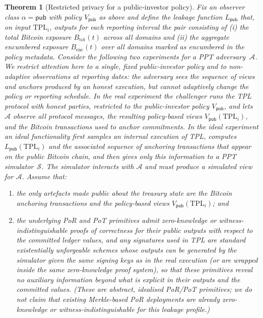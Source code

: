 \documentclass[11pt]{article}
\newtheorem{theorem}{Theorem}
\begin{document}
\begin{theorem}[Restricted privacy for a public-investor policy]
\label{thm:pub-privacy}
Fix an observer class $\alpha = \mathsf{pub}$ with policy $V_{\mathsf{pub}}$ as above and define the leakage function
$L_{\mathsf{pub}}$ that, on input $\mathrm{TPL}_i$, outputs for each reporting interval the pair consisting of
(i) the total Bitcoin exposure $B_{\mathrm{tot}}(t)$ across all domains and (ii) the aggregate encumbered exposure
$B_{\mathrm{enc}}(t)$ over all domains marked as encumbered in the policy metadata.
Consider the following two experiments for a PPT adversary~$\mathcal{A}$. We restrict attention here to a single, fixed public-investor policy and to non-adaptive observations at reporting dates: the adversary sees the sequence of views and anchors produced by an honest execution, but cannot adaptively change the policy or reporting schedule.
In the \emph{real} experiment the challenger runs the TPL protocol with honest parties,
restricted to the public-investor policy $V_{\mathsf{pub}}$, and lets $\mathcal{A}$ observe all
protocol messages, the resulting policy-based views $V_{\mathsf{pub}}(\mathrm{TPL}_i)$, and the Bitcoin
transactions used to anchor commitments.
In the \emph{ideal} experiment an ideal functionality first samples an internal execution of TPL,
computes $L_{\mathsf{pub}}(\mathrm{TPL}_i)$ and the associated sequence of anchoring transactions that appear on the
public Bitcoin chain, and then gives only this information to a PPT simulator~$\mathcal{S}$.
The simulator interacts with $\mathcal{A}$ and must produce a simulated view for $\mathcal{A}$.
Assume that:
\begin{enumerate}[noitemsep]
  \item the only artefacts made public about the treasury state are the Bitcoin anchoring transactions and the
        policy-based views $V_{\mathsf{pub}}(\mathrm{TPL}_i)$; and
  \item the underlying PoR and PoT primitives admit zero-knowledge or witness-indistinguishable proofs of correctness for their public outputs with respect to the committed ledger values, and any signatures used in TPL are standard existentially unforgeable schemes whose outputs can be generated by the simulator given the same signing keys as in the real execution (or are wrapped inside the same zero-knowledge proof system), so that these primitives reveal no auxiliary information beyond what is explicit in their outputs and the committed values.
        (These are abstract, idealised PoR/PoT primitives; we do not claim that existing Merkle-based PoR deployments
        are already zero-knowledge or witness-indistinguishable for this leakage profile.)
\end{enumerate}


\end{theorem}
\end{document}
